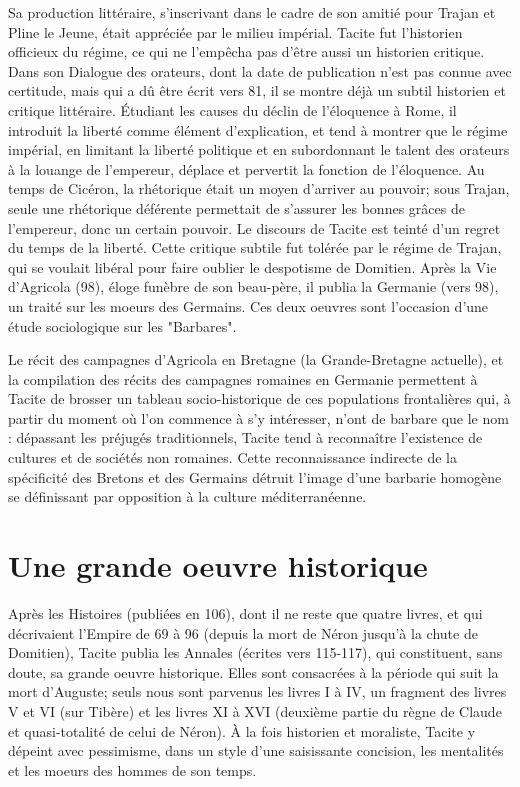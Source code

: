 \documentclass{cornouaille}
\begin{document}
Sa production littéraire, 
s'inscrivant dans le cadre de son amitié pour Trajan et Pline le Jeune,
 était appréciée par le milieu impérial. 
Tacite fut l'historien officieux du régime,
 ce qui ne l'empêcha pas d'être aussi un historien critique.
 Dans son Dialogue des orateurs, 
dont la date de publication n'est pas connue avec certitude,
 mais qui a dû être écrit vers 81,
 il se montre déjà un subtil historien et critique littéraire. 
Étudiant les causes du déclin de l'éloquence à Rome, 
il introduit la liberté comme élément d'explication, 
et tend à montrer que le régime impérial, 
en limitant la liberté politique 
et en subordonnant le talent des orateurs à la louange de l'empereur,
 déplace et pervertit la fonction de l'éloquence.
 Au temps de Cicéron, la rhétorique était un moyen d'arriver au pouvoir;
 sous Trajan, seule une rhétorique déférente permettait 
de s'assurer les bonnes grâces de l'empereur,
 donc un certain pouvoir.
 Le discours de Tacite est teinté d'un regret du temps de la liberté.
 Cette critique subtile fut tolérée par le régime de Trajan,
 qui se voulait libéral pour faire oublier le despotisme de Domitien.
Après la Vie d'Agricola (98), 
éloge funèbre de son beau-père,
 il publia la Germanie (vers 98),
 un traité sur les moeurs des Germains. 
Ces deux oeuvres sont l'occasion d'une étude sociologique sur les "Barbares".

Le récit des campagnes d'Agricola en Bretagne (la Grande-Bretagne actuelle),
 et la compilation des récits des campagnes romaines en Germanie
 permettent à Tacite de brosser 
un tableau socio-historique de ces populations frontalières qui,
 à partir du moment où l'on commence à s'y intéresser,
 n'ont de barbare que le nom :
 dépassant les préjugés traditionnels,
 Tacite tend à reconnaître l'existence de cultures 
et de sociétés non romaines.
 Cette reconnaissance indirecte de la spécificité des Bretons et des Germains 
détruit l'image d'une barbarie homogène se définissant 
par opposition à la culture méditerranéenne.

\section{Une grande oeuvre historique}
Après les Histoires (publiées en 106), 
dont il ne reste que quatre livres, 
et qui décrivaient l'Empire de 69 à 96 
(depuis la mort de Néron jusqu'à la chute de Domitien), 
Tacite publia les Annales (écrites vers 115-117), 
qui constituent, sans doute, sa grande oeuvre historique. Elles sont consacrées à la période qui suit la mort d'Auguste; seuls nous sont parvenus les livres I à IV, un fragment des livres V et VI (sur Tibère) et les livres XI à XVI (deuxième partie du règne de Claude et quasi-totalité de celui de Néron). À la fois historien et moraliste, Tacite y dépeint avec pessimisme, dans un style d'une saisissante concision, les mentalités et les moeurs des hommes de son temps.
\end{document}
